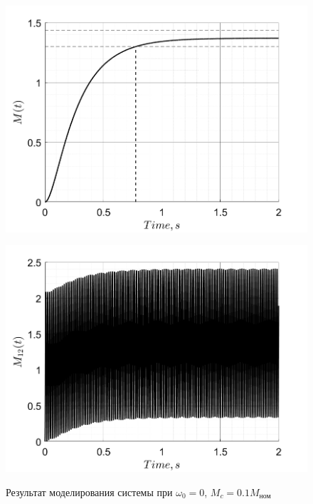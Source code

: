 \begin{figure}[!h]
\begin{minipage}{0.5\textwidth}
        \centering
        \includegraphics[width = \textwidth]{img/task22_M}
        \label{fig:img/task22_M}
    \end{minipage}%
    \begin{minipage}{0.5\textwidth}
        \centering
        \includegraphics[width = \textwidth]{img/task22_M12}
        \label{fig:img/task22_M12}
    \end{minipage}%
    \caption{Результат моделирования системы при $\omega_0 = 0$, $M_c = 0.1M_\text{ном}$}
\end{figure}

